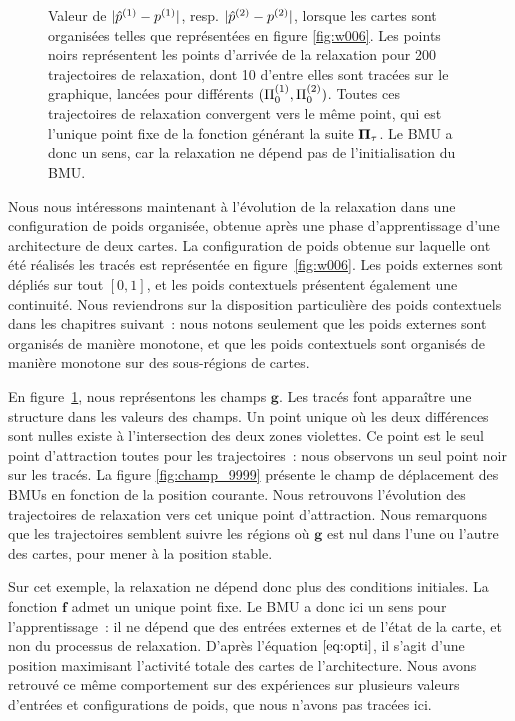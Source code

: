 \documentclass[../main]{subfiles}
\begin{document}
\begin{figure}
\begin{minipage}{0.5\textwidth}
	\end{minipage}
	\caption{Valeur de $\lvert{\hat{p}}^{({1})} - p^{({1})}\rvert$, resp. $\lvert{\hat{p}}^{({2})} - p^{({2})}\rvert$, lorsque les cartes sont organisées telles que représentées en figure \ref{fig:w006}. 
	Les points noirs représentent les points d'arrivée de la relaxation pour 200 trajectoires de relaxation, dont 10 d'entre elles sont tracées sur le graphique, lancées pour différents $(\Pi_0^{({1})}, \Pi_0^{({2})})$. Toutes ces trajectoires de relaxation convergent vers le même point, qui est l'unique point fixe de la fonction générant la suite $\mathbf{\Pi}_\tau$. Le BMU a donc un sens, car la relaxation ne dépend pas de l'initialisation du BMU.
	\label{fig:diff_relax_notraj}}
	\end{figure}

Nous nous intéressons maintenant à l'évolution de la relaxation dans une configuration de poids organisée, obtenue après une phase d'apprentissage d'une architecture de deux cartes.
La configuration de poids obtenue sur laquelle ont été réalisés les tracés est représentée en figure~\ref{fig:w006}. 
Les poids externes sont dépliés sur tout $[0,1]$, et les poids contextuels présentent également une continuité. Nous reviendrons sur la disposition particulière des poids contextuels dans les chapitres suivant~: nous notons seulement que les poids externes sont organisés de manière monotone, et que les poids contextuels sont organisés de manière monotone sur des sous-régions de cartes.

En figure~\ref{fig:diff_relax_notraj}, nous représentons les champs $\mathbf{g}$. 
Les tracés font apparaître une structure dans les valeurs des champs.
Un point unique où les deux différences sont nulles existe à l'intersection des deux zones violettes. Ce point est le seul point d'attraction toutes pour les trajectoires~: nous observons un seul point noir sur les tracés.
La figure \ref{fig:champ_9999} présente le champ de déplacement des BMUs en fonction de la position courante. 
Nous retrouvons l'évolution des trajectoires de relaxation vers cet unique point d'attraction. Nous remarquons que les trajectoires semblent suivre les régions où $\mathbf{g}$ est nul dans l'une ou l'autre des cartes, pour mener à la position stable. 

Sur cet exemple, la relaxation ne dépend donc plus des conditions initiales. La fonction $\mathbf{f}$ admet un unique point fixe. 
Le BMU a donc ici un sens pour l'apprentissage~: il ne dépend que des entrées externes et de l'état de la carte, et non du processus de relaxation. D'après l'équation $\ref{eq:opti}$, il s'agit d'une position maximisant l'activité totale des cartes de l'architecture.
Nous avons retrouvé ce même comportement sur des expériences sur plusieurs valeurs d'entrées et configurations de poids, que nous n'avons pas tracées ici.
\end{document}

